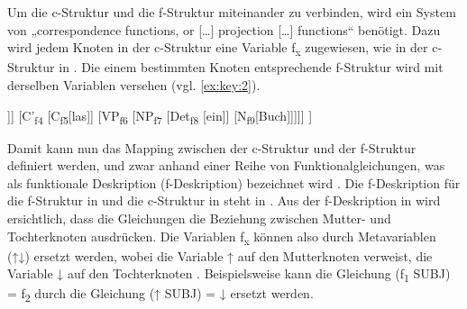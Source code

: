 Um die c-Struk\-tur und die f-Struk\-tur miteinander zu verbinden, wird ein System von „correspondence functions, or […] projection […] functions“ \citep[24]{Falk2001} benötigt. Dazu wird jedem Knoten in der c-Struk\-tur eine Variable f\textsubscript{x} zugewiesen, wie in der c-Struk\-tur in . Die einem bestimmten Knoten entsprechende f-Struk\-tur wird mit derselben Variablen versehen (vgl. \ref{ex:key:2}).

\ea%
    \label{ex:key:3}
\begin{forest}
[CP\textsubscript{f1}
	[NP\textsubscript{f2} [N\textsubscript{f3} [Max]]]
    [C'\textsubscript{f4}
    [C\textsubscript{f5}[las]]
    [VP\textsubscript{f6}
    [NP\textsubscript{f7} [Det\textsubscript{f8} [ein]] [N\textsubscript{f9}[Buch]]]]]
    ]
\end{forest}\z

  

 

Damit kann nun das Mapping zwischen der c-Struk\-tur und der f-Struk\-tur definiert werden, und zwar anhand einer Reihe von Funktionalgleichungen, was als funktionale Deskription (f-Des\-krip\-ti\-on) bezeichnet wird \citep[68–69]{Falk2001}. Die f-Des\-krip\-ti\-on für die f-Struk\-tur in  und die c-Struk\-tur in  steht in . Aus der f-Des\-krip\-tion in  wird ersichtlich, dass die Gleichungen die Beziehung zwischen Mutter- und Tochterknoten ausdrücken. Die Variablen f\textsubscript{x} können also durch Metavariablen (↑↓) ersetzt werden, wobei die Variable ↑ auf den Mutterknoten verweist, die Variable ↓ auf den Tochterknoten \citep[71]{Falk2001}. Beispielsweise kann die Gleichung (f\textsubscript{1} SUBJ) = f\textsubscript{2} durch die Gleichung (↑ SUBJ) = ↓ ersetzt werden.\largerpage[2]

